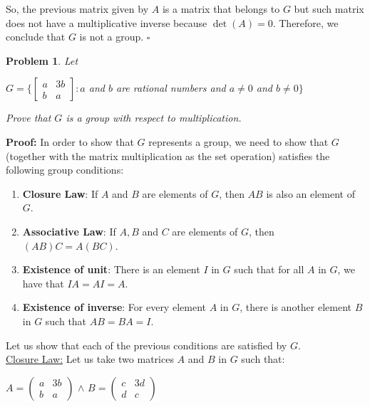 \documentclass[a4paper,openany,11pt]{book}
\newtheorem{Prob}{Problem}
\begin{document}
So, the previous matrix given by $A$ is a matrix that belongs to $G$ but such matrix does not have a multiplicative inverse because $\det(A) = 0$. Therefore, we conclude that $G$ is not a group. \hspace{0.1cm} $\square$

\begin{Prob}
	Let
	
	\begin{center}
		$G = \biggl\{\left[\begin{array}{cc}
		a & 3b\\
		b & a
		\end{array}\right] : a$ and $b$ are rational numbers and $a \neq 0$ and $b \neq 0\biggr\} $
	\end{center}
	
	Prove that $G$ is a group with respect to multiplication.
\end{Prob}

\textbf{Proof:} In order to show that $G$ represents a group, we need to show that $G$ (together with the matrix multiplication as the set operation) satisfies the following group conditions:

\begin{enumerate}
	\item \textbf{Closure Law}: If $A$ and $B$ are elements of $G$, then $AB$ is also an element of $G$. 
	
	\item \textbf{Associative Law}: If $A, B$ and $C$ are elements of $G$, then $(AB)C = A(BC)$.
	
	\item \textbf{Existence of unit}: There is an element $I$ in $G$ such that for all $A$ in $G$, we have that $IA = AI = A$.
	
	\item \textbf{Existence of inverse}: For every element $A$ in $G$, there is another element $B$ in $G$ such that $AB = BA = I$.
\end{enumerate}

Let us show that each of the previous conditions are satisfied by $G$.\\

\underline{Closure Law:} Let us take two matrices $A$ and $B$ in $G$ such that:

\begin{center}
	$A = \left(\begin{array}{cc}
	a & 3b\\
	b & a
	\end{array}\right)$ \hspace{0.1cm} $\wedge$ \hspace{0.1cm} $B = \left(\begin{array}{cc}
		c & 3d\\
		d & c
	\end{array}\right)$
\end{center}
\end{document}
